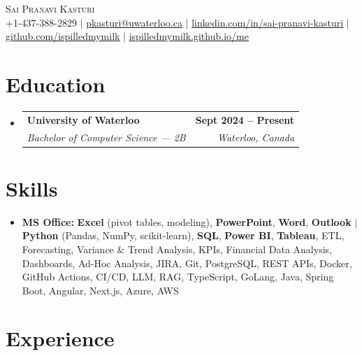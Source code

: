 \documentclass[letterpaper,10pt]{article}
\makeatletter
\newcommand{\resumeSubheading}[4]{
  \vspace{-1pt}\item
    \begin{tabular*}{1.0\textwidth}[t]{l@{\extracolsep{\fill}}r}
      \textbf{#1} & \textbf{\small #2} \\
      \textit{\small#3} & \textit{\small #4} \\[-2pt]
    \end{tabular*}\vspace{-7pt}
}
\newcommand{\resumeSubHeadingListStart}{\begin{itemize}[leftmargin=0.0in, label={}]}
\newcommand{\resumeSubHeadingListEnd}{\end{itemize}}
\makeatother
\begin{document}

\vspace{-28pt}
\begin{center}
    {\Huge \scshape Sai Pranavi Kasturi} \\
    \small +1-437-388-2829 $|$ \underline{pkasturi@uwaterloo.ca} $|$
    \href{https://linkedin.com/in/sai-pranavi-kasturi-704807298}{\underline{linkedin.com/in/sai-pranavi-kasturi}} $|$
    \href{https://github.com/ispilledmymilk}{\underline{github.com/ispilledmymilk}} $|$
    \href{https://ispilledmymilk.github.io/me/}{\underline{ispilledmymilk.github.io/me}}
    \vspace{-10pt}
\end{center}

\vspace{-10pt}
\section{Education}
  \resumeSubHeadingListStart
    \resumeSubheading
      {University of Waterloo}{Sept 2024 -- Present}
      {Bachelor of Computer Science --- 2B}{Waterloo, Canada}
  \resumeSubHeadingListEnd
\vspace{-8pt}

\section{Skills}
\begin{itemize}[leftmargin=0.05in, label={}]
  \small\item{
    \textbf{MS Office:} \textbf{Excel} (pivot tables, modeling), \textbf{PowerPoint}, \textbf{Word}, \textbf{Outlook} $|$ \textbf{Python} (Pandas, NumPy, scikit-learn), \textbf{SQL}, \textbf{Power BI}, \textbf{Tableau}, ETL, Forecasting, Variance \& Trend Analysis, KPIs, Financial Data Analysis, Dashboards, Ad-Hoc Analysis, JIRA, Git, PostgreSQL, REST APIs, Docker, GitHub Actions, CI/CD, LLM, RAG, TypeScript, GoLang, Java, Spring Boot, Angular, Next.js, Azure, AWS
  }
\end{itemize}
\vspace{-18pt}

\vspace{1.20pt}
\section{Experience}
\end{document}
